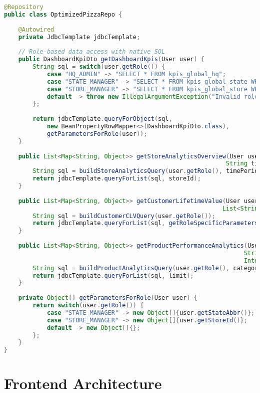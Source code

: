 \documentclass[11pt,a4paper]{article}
\begin{document}
\begin{lstlisting}[language=java, caption=Optimized Repository]
@Repository
public class OptimizedPizzaRepo {
    
    @Autowired
    private JdbcTemplate jdbcTemplate;
    
    // Role-based data access with native SQL
    public DashboardKpiDto getDashboardKpis(User user) {
        String sql = switch(user.getRole()) {
            case "HQ_ADMIN" -> "SELECT * FROM kpis_global_hq";
            case "STATE_MANAGER" -> "SELECT * FROM kpis_global_state WHERE state_abbr = ?";
            case "STORE_MANAGER" -> "SELECT * FROM kpis_global_store WHERE storeid = ?";
            default -> throw new IllegalArgumentException("Invalid role: " + user.getRole());
        };
        
        return jdbcTemplate.queryForObject(sql, 
            new BeanPropertyRowMapper<>(DashboardKpiDto.class),
            getParametersForRole(user));
    }
    
    public List<Map<String, Object>> getStoreAnalyticsOverview(User user, String storeId, 
                                                              String timePeriod) {
        String sql = buildStoreAnalyticsQuery(user.getRole(), timePeriod);
        return jdbcTemplate.queryForList(sql, storeId);
    }
    
    public List<Map<String, Object>> getCustomerLifetimeValue(User user, Integer limit, 
                                                             List<String> states) {
        String sql = buildCustomerCLVQuery(user.getRole());
        return jdbcTemplate.queryForList(sql, getRoleSpecificParameters(user));
    }
    
    public List<Map<String, Object>> getProductPerformanceAnalytics(User user, 
                                                                   String category, 
                                                                   Integer limit) {
        String sql = buildProductAnalyticsQuery(user.getRole(), category);
        return jdbcTemplate.queryForList(sql, limit);
    }
    
    private Object[] getParametersForRole(User user) {
        return switch(user.getRole()) {
            case "STATE_MANAGER" -> new Object[]{user.getStateAbbr()};
            case "STORE_MANAGER" -> new Object[]{user.getStoreId()};
            default -> new Object[]{};
        };
    }
}
\end{lstlisting}

\section{Frontend Architecture}
\end{document}
